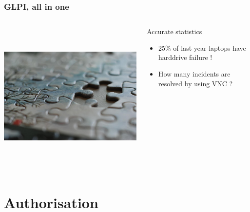 \documentclass{beamer}
\begin{document}
\begin{frame}


    \frametitle{GLPI, all in one}
 \begin{columns}
 \begin{column}{0.45\textwidth}
         \includegraphics[height=7.5cm]{./pics/glpithelink.jpg}
 \end{column}
 \begin{column}{0.65\textwidth}
    \begin{block}{Accurate statistics}
        \begin{itemize}
            \item 25\% of last year laptops have harddrive failure !
            \item How many incidents are resolved by using VNC  ?
        \end{itemize}

    \end{block}

 \end{column}
\end{columns}
\end{frame}

\section{Authorisation}
\end{document}
